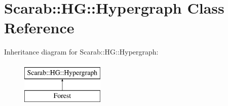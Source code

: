 \hypertarget{classScarab_1_1HG_1_1Hypergraph}{
\section{Scarab::HG::Hypergraph Class Reference}
\label{classScarab_1_1HG_1_1Hypergraph}
}
Inheritance diagram for Scarab::HG::Hypergraph:\begin{figure}[H]
\begin{center}
\leavevmode
\includegraphics[height=2cm]{classScarab_1_1HG_1_1Hypergraph}
\end{center}
\end{figure}
